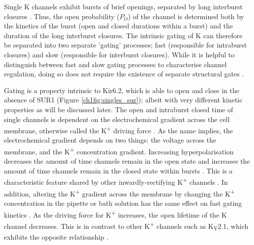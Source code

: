 Single K\ATP{} channels exhibit bursts of brief openings, separated by long interburst closures \cite{alekseev_ligand-insensitive_1998, babenko_two_1999, li_open_2002, proks_modeling_2009}.
Thus, the open probability ($P_O$) of the channel is determined both by the kinetics of the burst (open and closed durations within a burst) and the duration of the long interburst closures.
The intrinsic gating of K\ATP{} can therefore be separated into two separate 'gating' processes; fast (responsible for intraburst closures) and slow (responsible for interburst closures).
While it is helpful to distinguish between fast and slow gating processes to characterise channel regulation, doing so does not require the existence of separate structural gates \cite{proks_modeling_2009, hille_ion_2001}.

Gating is a property intrinsic to Kir6.2, which is able to open and close in the absence of SUR1 \cite{tucker_truncation_1997, enkvetchakul_kinetic_2000-1} (Figure \ref{ch1fig:singles_sur}); albeit with very different kinetic properties as will be discussed later.
The open and intraburst closed time of single channels is dependent on the electrochemical gradient across the cell membrane, otherwise called the K\textsuperscript{+} driving force \cite{benz_characterization_1998}.
As the name implies, the electrochemical gradient depends on two things: the voltage across the membrane, and the K\textsuperscript{+} concentration gradient.
Increasing hyperpolarisation decreases the amount of time channels remain in the open state and increases the amount of time channels remain in the closed state within bursts \cite{alekseev_burst_1997, trapp_molecular_1998-1}.
This is a characteristic feature shared by other inwardly-rectifying K\textsuperscript{+} channels \cite{sakmann_voltage-dependent_1984, alekseev_burst_1997}.
In addition, altering the  K\textsuperscript{+} gradient across the membrane by changing the K\textsuperscript{+} concentration in the pipette or bath solution has the same effect on fast gating kinetics \cite{zilberter_gating_1988, benz_characterization_1998}.
As the driving force for K\textsuperscript{+} increases, the open lifetime of the K\ATP{} channel decreases.
This is in contrast to other K\textsuperscript{+} channels such as K\textsubscript{V}2.1, which exhibits the opposite relationship \cite{chapman_allosteric_2006}.

